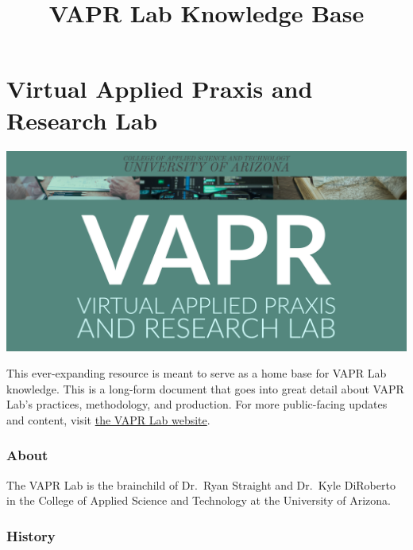 \documentclass[
  12pt,
]{memoir}
\title{VAPR Lab Knowledge Base}
\author{}
\date{\vspace{-2.5em}}
\begin{document}
\maketitle

{
\hypersetup{linkcolor=}
\setcounter{tocdepth}{1}
\tableofcontents
}
\listoftables
\listoffigures
\hypertarget{virtual-applied-praxis-and-research-lab}{%
\chapter*{Virtual Applied Praxis and Research Lab}\label{virtual-applied-praxis-and-research-lab}}

\includegraphics{images/VAPR-brand-banner.png}

This ever-expanding resource is meant to serve as a home base for VAPR Lab knowledge. This is a long-form document that goes into great detail about VAPR Lab's practices, methodology, and production. For more public-facing updates and content, visit \href{https://VAPR-Lab.github.io/vapr-website}{the VAPR Lab website}.

\hypertarget{about}{%
\subsection*{About}\label{about}}

The VAPR Lab is the brainchild of Dr.~Ryan Straight and Dr.~Kyle DiRoberto in the College of Applied Science and Technology at the University of Arizona.

\hypertarget{history}{%
\subsection*{History}\label{history}}
\end{document}
